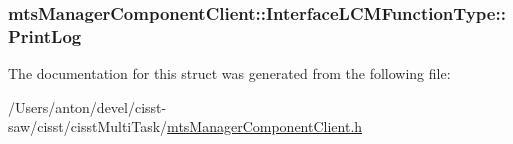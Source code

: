 \subsubsection[{Print\+Log}]{ mts\+Manager\+Component\+Client\+::\+Interface\+L\+C\+M\+Function\+Type\+::\+Print\+Log}\label{structmts_manager_component_client_1_1_interface_l_c_m_function_type_a83bc0995c57922552c5310b398e0bcdb}


The documentation for this struct was generated from the following file\+:\begin{DoxyCompactItemize}
\item 
/\+Users/anton/devel/cisst-\/saw/cisst/cisst\+Multi\+Task/\hyperlink{mts_manager_component_client_8h}{mts\+Manager\+Component\+Client.\+h}\end{DoxyCompactItemize}
